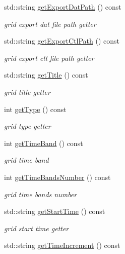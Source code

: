 \begin{DoxyCompactItemize}
std\-::string \hyperlink{classfwi_1_1grid_1_1Grid_a4fdc08766fd405bd37d38a6709c08342}{get\-Export\-Dat\-Path} () const 
\begin{DoxyCompactList}\small\item\em grid export dat file path getter \end{DoxyCompactList}\item 
std\-::string \hyperlink{classfwi_1_1grid_1_1Grid_a2a47f95c96985a5e639285bde471d9a5}{get\-Export\-Ctl\-Path} () const 
\begin{DoxyCompactList}\small\item\em grid export ctl file path getter \end{DoxyCompactList}\item 
std\-::string \hyperlink{classfwi_1_1grid_1_1Grid_a7e9e12dc12588d1834c261b610cac319}{get\-Title} () const 
\begin{DoxyCompactList}\small\item\em grid title getter \end{DoxyCompactList}\item 
int \hyperlink{classfwi_1_1grid_1_1Grid_a2deb54df5fc5e90b3b5b061a516c2a92}{get\-Type} () const 
\begin{DoxyCompactList}\small\item\em grid type getter \end{DoxyCompactList}\item 
int \hyperlink{classfwi_1_1grid_1_1Grid_ae9043ae6499a47872c6161516b721e21}{get\-Time\-Band} () const 
\begin{DoxyCompactList}\small\item\em grid time band \end{DoxyCompactList}\item 
int \hyperlink{classfwi_1_1grid_1_1Grid_ac6f053b3983bf2f651a1a523b8591be4}{get\-Time\-Bands\-Number} () const 
\begin{DoxyCompactList}\small\item\em grid time bands number \end{DoxyCompactList}\item 
std\-::string \hyperlink{classfwi_1_1grid_1_1Grid_a869002c87fc7e935b66c40ea712b90e4}{get\-Start\-Time} () const 
\begin{DoxyCompactList}\small\item\em grid start time getter \end{DoxyCompactList}\item 
std\-::string \hyperlink{classfwi_1_1grid_1_1Grid_aa6a35277617cbae5fe3db3f9ae28558d}{get\-Time\-Increment} () const 

\end{DoxyCompactItemize}
